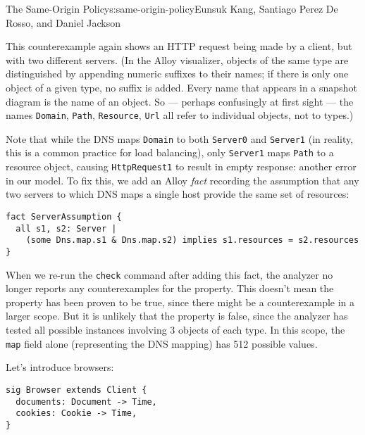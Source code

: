 \begin{aosachapter}{The Same-Origin Policy}{s:same-origin-policy}{Eunsuk Kang, Santiago Perez De Rosso, and Daniel Jackson}


This counterexample again shows an HTTP request being made by a client,
but with two different servers. (In the Alloy visualizer, objects of the
same type are distinguished by appending numeric suffixes to their
names; if there is only one object of a given type, no suffix is added.
Every name that appears in a snapshot diagram is the name of an object.
So --- perhaps confusingly at first sight --- the names \texttt{Domain},
\texttt{Path}, \texttt{Resource}, \texttt{Url} all refer to individual
objects, not to types.)

Note that while the DNS maps \texttt{Domain} to both \texttt{Server0}
and \texttt{Server1} (in reality, this is a common practice for load
balancing), only \texttt{Server1} maps \texttt{Path} to a resource
object, causing \texttt{HttpRequest1} to result in empty response:
another error in our model. To fix this, we add an Alloy \emph{fact}
recording the assumption that any two servers to which DNS maps a single
host provide the same set of resources:

\begin{verbatim}
fact ServerAssumption {
  all s1, s2: Server | 
    (some Dns.map.s1 & Dns.map.s2) implies s1.resources = s2.resources
}
\end{verbatim}

When we re-run the \texttt{check} command after adding this fact, the
analyzer no longer reports any counterexamples for the property. This
doesn't mean the property has been proven to be true, since there might
be a counterexample in a larger scope. But it is unlikely that the
property is false, since the analyzer has tested all possible instances
involving 3 objects of each type. In this scope, the \texttt{map} field
alone (representing the DNS mapping) has 512 possible values.

\label{browser}

Let's introduce browsers:

\begin{verbatim}
sig Browser extends Client {
  documents: Document -> Time,
  cookies: Cookie -> Time,
}
\end{verbatim}


\end{aosachapter}
